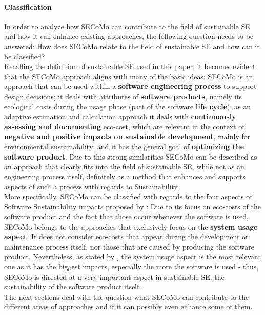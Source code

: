 \documentclass[oribibl]{llncs}
\begin{document}
\paragraph{Classification}
In order to analyze how SECoMo can contribute to the field of sustainable SE and how it can enhance existing approaches, the following question needs to be answered: How does SECoMo relate to the field of sustainable SE and how can it be classified?\\
Recalling the definition of sustainable SE %
used in this paper, it becomes evident that the SECoMo approach aligns with many of the basic ideas: SECoMo is an approach that can be used within a \textbf{software engineering process} to support design decisions; it deals with attributes of \textbf{software products}, namely its ecological costs during the usage phase (part of the software \textbf{life cycle}); as an adaptive estimation and calculation approach it deals with \textbf{continuously assessing and documenting} eco-cost, which are relevant in the context of \textbf{negative and positive impacts on sustainable development}, mainly for environmental sustainability; and it has the general goal of \textbf{optimizing the software product}. Due to this strong similarities SECoMo can be described as an approach that clearly fits into the field of sustainable SE, while not as an engineering process itself, definitely as a method that enhances and supports aspects of such a process with regards to Sustainability.\\
More specifically, SECoMo can be classified with regards to the four aspects of Software Sustainability impacts proposed by \cite{penzenstadler_supporting_2012}: Due to its focus on eco-costs of the software product and the fact that those occur whenever the software is used, SECoMo belongs to the approaches that exclusively focus on the \textbf{system usage aspect}. It does not consider eco-costs that appear during the development or maintenance process itself, nor those that are caused by producing the software product. Nevertheless, as stated by \cite{penzenstadler_what_13}, the system usage aspect is the most relevant one as it has the biggest impacts, especially the more the software is used - thus, SECoMo is directed at a very important aspect in sustainable SE: the sustainability of the software product itself.\\
The next sections deal with the question what SECoMo can contribute to the different areas of approaches and if it can possibly even enhance some of them.
\end{document}
